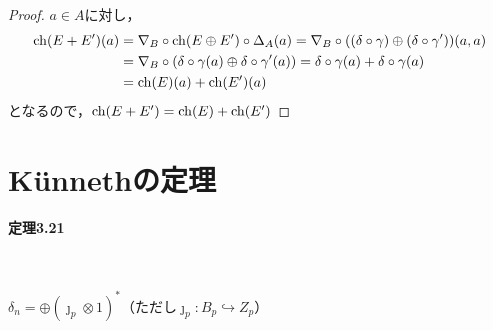 \begin{proof}
  $a \in A$に対し，
  \begin{align*}
      \operatorname{ch}(E + E')(a) &= \nabla_B \circ \operatorname{ch}(E \oplus E') \circ \Delta_A (a) = \nabla_B \circ ((\delta \circ \gamma) \oplus (\delta \circ \gamma')) (a, a) \\
     &= \nabla_B \circ (\delta \circ \gamma (a) \oplus \delta \circ \gamma' (a)) = \delta \circ \gamma (a) + \delta \circ \gamma (a) \\
     &= \operatorname{ch}(E)(a) + \operatorname{ch}(E')(a)
  \end{align*}
  となるので，$\operatorname{ch}(E + E') = \operatorname{ch}(E) + \operatorname{ch}(E')$
\end{proof}

\section{K\"unnethの定理}
\paragraph{定理3.21}~
\begin{screen}
  $\delta_n = \oplus (\jmath_p \otimes 1)^\ast$（ただし$\jmath_p \colon B_p \hookrightarrow Z_p$）
\end{screen}

